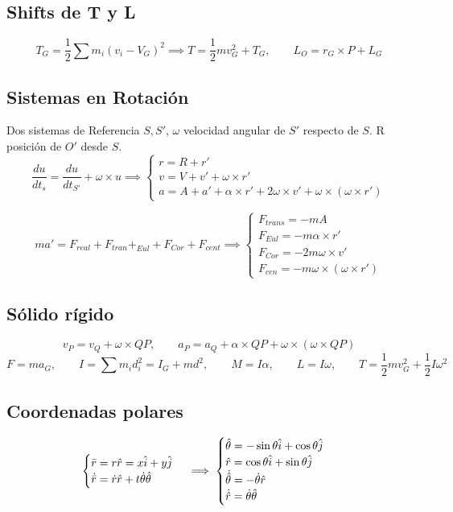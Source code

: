 \documentclass[leqno]{article}
\newcommand{\1}{\tikz[baseline=(char.base)]{
            \node[shape=circle,draw,inner sep=1pt] (char) {1};}}
\newcommand{\2}{\tikz[baseline=(char.base)]{
            \node[shape=circle,draw,inner sep=1pt] (char) {2};}}
\begin{document}
\subsection{Shifts de T y L}
$$
T_G = \frac{1}{2}\sum m_i(v_i-V_G)^2 \implies  T = \frac{1}{2}mv_G^2 + T_G, \qquad L_O = r_G\times P + L_G 
$$

\subsection{Sistemas en Rotación}
Dos sistemas de Referencia $S, S'$, $\omega$ velocidad angular de $S'$ respecto de $S$. R posición de $O'$ desde $S$.
$$
\frac{du}{dt_s} = \frac{du}{dt_{S'}} + \omega\times u \implies \begin{cases}
r = R + r'  \\
v = V + v' + \omega\times r'  \\
a = A + a' + \alpha\times r' + 2\omega\times v' + \omega\times(\omega\times r')
\end{cases}
$$

$$
ma' = F_{real} + F_{tran} + _{Eul} + F_{Cor} + F_{cent} \implies \begin{cases}
F_{trans} = -mA\\
F_{Eul} = -m\alpha\times r' \\
F_{Cor} = -2m\omega\times v'\\
F_{cen} = -m\omega\times (\omega\times r')
\end{cases}
$$

\subsection{Sólido rígido}
$$
v_P = v_Q + \omega\times QP, \qquad a_P = a_Q + \alpha \times QP + \omega\times(\omega\times QP)
$$
$$
F = ma_G, \qquad I = \sum m_id_i^2 = I_G + md^2, \qquad M = I\alpha, \qquad L = I\omega, \qquad T = \frac{1}{2}mv_G^2 + \frac{1}{2}I\omega^2
$$


\subsection{Coordenadas polares}
$$
\begin{cases}
\Bar{r} = r\hat{r} = x\hat{i} + y\hat{j} \\
\dot{\Bar{r}} = \dot r\hat{r} + t\dot\theta\hat{\theta}
\end{cases}
\implies 
\begin{cases}
\hat\theta = -\sin\theta \hat{i} + \cos\theta\hat{j} \\
\hat r = \cos\theta \hat{i} + \sin\theta\hat{j} \\
\dot{\hat\theta} = -\dot\theta \hat r \\
\dot{\hat r} = \dot\theta \hat\theta
\end{cases}
$$
\end{document}
